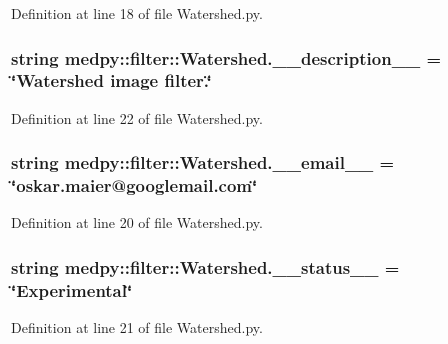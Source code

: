 Definition at line 18 of file Watershed.py.

\hypertarget{namespacemedpy_1_1filter_1_1Watershed_a8021fa0fe90075a1c675387351a96040}{
\subsubsection[{\_\-\_\-description\_\-\_\-}]{\setlength{\rightskip}{0pt plus 5cm}string {\bf medpy::filter::Watershed.\_\-\_\-description\_\-\_\-} = \char`\"{}Watershed image filter.\char`\"{}}}
\label{namespacemedpy_1_1filter_1_1Watershed_a8021fa0fe90075a1c675387351a96040}


Definition at line 22 of file Watershed.py.

\hypertarget{namespacemedpy_1_1filter_1_1Watershed_a473a5c5a9495b5b00925706de0cc927b}{
\subsubsection[{\_\-\_\-email\_\-\_\-}]{\setlength{\rightskip}{0pt plus 5cm}string {\bf medpy::filter::Watershed.\_\-\_\-email\_\-\_\-} = \char`\"{}oskar.maier@googlemail.com\char`\"{}}}
\label{namespacemedpy_1_1filter_1_1Watershed_a473a5c5a9495b5b00925706de0cc927b}


Definition at line 20 of file Watershed.py.

\hypertarget{namespacemedpy_1_1filter_1_1Watershed_a3ca58f6b2784a17f234330325e024e42}{
\subsubsection[{\_\-\_\-status\_\-\_\-}]{\setlength{\rightskip}{0pt plus 5cm}string {\bf medpy::filter::Watershed.\_\-\_\-status\_\-\_\-} = \char`\"{}Experimental\char`\"{}}}
\label{namespacemedpy_1_1filter_1_1Watershed_a3ca58f6b2784a17f234330325e024e42}


Definition at line 21 of file Watershed.py.

